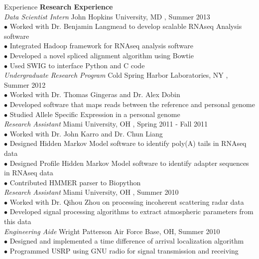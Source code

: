 \documentclass{resume} %
\begin{document}
\begin{rSection}{Experience}
  \textbf{Research Experience}\\[1 mm]
  \textit{Data Scientist Intern} \hfill John Hopkins University, MD , Summer 2013 \\ [1 mm]
  $\bullet$ Worked with Dr. Benjamin Langmead to develop scalable RNAseq Analysis software \\
  $\bullet$ Integrated Hadoop framework for RNAseq analysis software \\
  $\bullet$ Developed a novel spliced alignment algorithm using Bowtie \\
  $\bullet$ Used SWIG to interface Python and C code \\
  \textit{Undergraduate Research Program} \hfill Cold Spring Harbor Laboratories, NY , Summer 2012 \\ [1 mm]
  $\bullet$ Worked with Dr. Thomas Gingeras and Dr. Alex Dobin\\
  $\bullet$ Developed software that maps reads between the reference and personal genome \\
  $\bullet$ Studied Allele Specific Expression in a personal genome \\ 
  \textit{Research Assistant} \hfill Miami University, OH , Spring 2011 - Fall 2011 \\ [1 mm]
  $\bullet$ Worked with Dr. John Karro and Dr. Chun Liang\\
  $\bullet$ Designed Hidden Markov Model software to identify poly(A) tails in RNAseq data\\
  $\bullet$ Designed Profile Hidden Markov Model software to identify adapter sequences in RNAseq data\\
  $\bullet$ Contributed HMMER parser to Biopython\\[3 mm]
  \textit{Research Assistant} \hfill Miami University, OH , Summer 2010 \\ [1 mm]
  $\bullet$ Worked with Dr. Qihou Zhou on processing incoherent scattering radar data\\
  $\bullet$ Developed signal processing algorithms to extract atmospheric parameters from this data\\[3 mm]
  \textit{Engineering Aide} \hfill Wright Patterson Air Force Base, OH, Summer 2010 \\ [1 mm]
  $\bullet$ Designed and implemented a time difference of arrival localization algorithm \\
  $\bullet$ Programmed USRP using GNU radio for signal transmission and receiving \\[3 mm]

\end{rSection}
\end{document}
